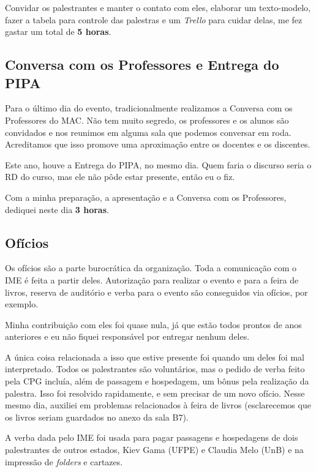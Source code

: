 \documentclass[12pt,letterpaper]{article}
\begin{document}
	Convidar os palestrantes e manter o contato com eles, elaborar um texto-modelo, fazer a tabela para controle das palestras e um \textit{Trello} para cuidar delas, me fez gastar um total de \textbf{5 horas}. 
	
	\subsection{Conversa com os Professores e Entrega do PIPA}
	
	Para o último dia do evento, tradicionalmente realizamos a Conversa com os Professores do MAC. Não tem muito segredo, os professores e os alunos são convidados e nos reunimos em alguma sala que podemos conversar em roda. Acreditamos que isso promove uma aproximação entre os docentes e os discentes.
	
	Este ano, houve a Entrega do PIPA, no mesmo dia. Quem faria o discurso seria o RD do curso, mas ele não pôde estar presente, então eu o fiz. 
	
	Com a minha preparação, a apresentação e a Conversa com os Professores, dediquei neste dia \textbf{3 horas}.
	
	\subsection{Ofícios}
	
	Os ofícios são a parte burocrática da organização. Toda a comunicação com o IME é feita a partir deles. Autorização para realizar o evento e para a feira de livros, reserva de auditório e verba para o evento são conseguidos via ofícios, por exemplo.
	
	Minha contribuição com eles foi quase nula, já que estão todos prontos de anos anteriores e eu não fiquei responsável por entregar nenhum deles.
	
	A única coisa relacionada a isso que estive presente foi quando um deles foi mal interpretado. Todos os palestrantes são voluntários, mas o pedido de verba feito pela CPG incluía, além de passagem e hospedagem, um bônus pela realização da palestra. Isso foi resolvido rapidamente, e sem precisar de um novo ofício. Nesse mesmo dia, auxiliei em problemas relacionados à feira de livros (esclarecemos que os livros seriam guardados no anexo da sala B7).
	
	A verba dada pelo IME foi usada para pagar passagens e hospedagens de dois palestrantes de outros estados, Kiev Gama (UFPE) e Claudia Melo (UnB) e na impressão de \textit{folders} e cartazes.
	
\end{document}
